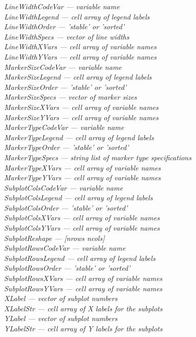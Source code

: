 \documentclass{article}
\newcommand{\namevalue}[2]{{\it #1 --- #2}}
\begin{document}
\namevalue{LineWidthCodeVar}{variable name} \\
\namevalue{LineWidthLegend}{cell array of legend labels} \\
\namevalue{LineWidthOrder}{'stable' or 'sorted'} \\
\namevalue{LineWidthSpecs}{vector of line widths} \\
\namevalue{LineWidthXVars}{cell array of variable names} \\
\namevalue{LineWidthYVars}{cell array of variable names} \\
\namevalue{MarkerSizeCodeVar}{variable name} \\
\namevalue{MarkerSizeLegend}{cell array of legend labels} \\
\namevalue{MarkerSizeOrder}{'stable' or 'sorted'} \\
\namevalue{MarkerSizeSpecs}{vector of marker sizes} \\
\namevalue{MarkerSizeXVars}{cell array of variable names} \\
\namevalue{MarkerSizeYVars}{cell array of variable names} \\
\namevalue{MarkerTypeCodeVar}{variable name} \\
\namevalue{MarkerTypeLegend}{cell array of legend labels} \\
\namevalue{MarkerTypeOrder}{'stable' or 'sorted'} \\
\namevalue{MarkerTypeSpecs}{string list of marker type specifications} \\
\namevalue{MarkerTypeXVars}{cell array of variable names} \\
\namevalue{MarkerTypeYVars}{cell array of variable names} \\
\namevalue{SubplotColsCodeVar}{variable name} \\
\namevalue{SubplotColsLegend}{cell array of legend labels} \\
\namevalue{SubplotColsOrder}{'stable' or 'sorted'} \\
\namevalue{SubplotColsXVars}{cell array of variable names} \\
\namevalue{SubplotColsYVars}{cell array of variable names} \\
\namevalue{SubplotReshape}{[nrows ncols]} \\
\namevalue{SubplotRowsCodeVar}{variable name} \\
\namevalue{SubplotRowsLegend}{cell array of legend labels} \\
\namevalue{SubplotRowsOrder}{'stable' or 'sorted'} \\
\namevalue{SubplotRowsXVars}{cell array of variable names} \\
\namevalue{SubplotRowsYVars}{cell array of variable names} \\
\namevalue{XLabel}{vector of subplot numbers} \\
\namevalue{XLabelStr}{cell array of X labels for the subplots} \\
\namevalue{YLabel}{vector of subplot numbers} \\
\namevalue{YLabelStr}{cell array of Y labels for the subplots} \\
\end{document}
